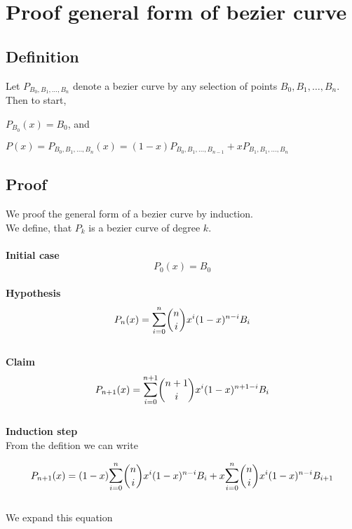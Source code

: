 \section{Proof general form of bezier curve}
\label{sec:proofgeneralformofbeziercurve}

\subsection{Definition}
Let $P_{B_0,B_1,\ldots,B_n}$ denote a bezier curve by any selection of points $B_0,B_1,\ldots,B_n$.
Then to start,

$P_{B_0}(x)=B_0$, and

$P(x)=P_{B_0,B_1,\ldots,B_n}(x)=(1-x)P_{B_0,B_1,\ldots,B_{n-1}}+xP_{B_1,B_1,\ldots,B_n}$

\subsection{Proof}
We proof the general form of a bezier curve by induction.
\\
We define, that $P_k$ is a bezier curve of degree $k$.
\\
\\
\textbf{Initial case}
\\
\begin{equation*}
    P_0(x)=B_0
\end{equation*}
\\
\textbf{Hypothesis}
\\
\begin{equation*}
    P_n(x)=\mathlarger{\sum}_{i = 0}^{n} {n \choose i}x^i (1-x)^{n-i} B_i
\end{equation*}
\\
\textbf{Claim}
\\
\begin{equation*}
    P_{n+1}(x)=\mathlarger{\sum}_{i = 0}^{n+1} {n+1 \choose i}x^i (1-x)^{n+1-i} B_i
\end{equation*}
\\
\textbf{Induction step}
\\
From the defition we can write

\begin{equation*}
    P_{n+1}(x)=(1-x)\mathlarger{\sum}_{i = 0}^{n} {n \choose i}x^i (1-x)^{n-i}B_i + x\mathlarger{\sum}_{i = 0}^{n} {n \choose i}x^i (1-x)^{n-i}B_{i+1}
\end{equation*}
\\
We expand this equation

